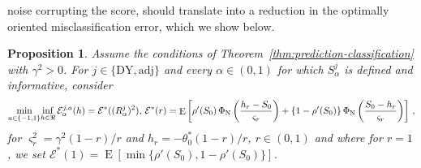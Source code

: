 \documentclass{article}
\DeclareMathOperator{\expect}{E}
\newtheorem{proposition}[theorem]{Proposition}
\theoremstyle{definition}
\begin{document}
\begin{bibunit}
noise corrupting the score, should translate into a reduction in the
optimally oriented misclassification error, which we show below.
\begin{proposition}
\label{prop:prediction-comparison}
Assume the conditions of Theorem~\ref{thm:prediction-classification} with
$\gamma^2>0$. For $j\in\{\mathrm{DY},\mathrm{adj}\}$ and every
$\alpha\in(0,1)$ for which $S_\alpha^j$ is defined and informative, consider
\begin{equation}
\label{eq:prediction-mer-logits}
    \underset{a \in \{-1,1\}}{\min}\underset{h\in\Re}{\inf} \, \mathcal E_\alpha^{j,a}(h)
    =
    \mathcal E^*((R_\alpha^j)^2),
    \, 
    \mathcal E^*(r)
    =
    \expect\left[
        \rho'(S_0)\,\Phi_{\rm N}\left(\frac{h_r-S_0}{\varsigma_r}\right)
        +\left\{1-\rho'(S_0)\right\}
        \Phi_{\rm N}\left(\frac{S_0-h_r}{\varsigma_r}\right)
    \right] \,,
\end{equation}
for $\varsigma_r^2=\gamma^2(1-r)/r$ and
$h_r=-\theta_0^*(1-r)/r$, $r \in (0,1)$ and where for $r=1$, we set
$\mathcal E^*(1)=\expect[\min\{\rho'(S_0),1-\rho'(S_0)\}]$.


\end{proposition}
\end{bibunit}
\end{document}
